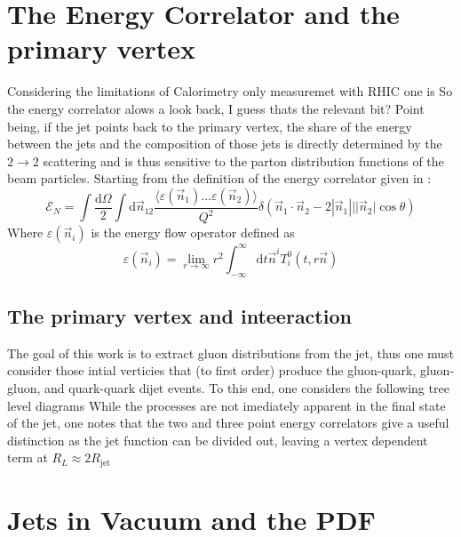 \documentclass[letterpaper, 12pt, oneside]{book}
\newcommand{\dd}{\textrm{d}}
\theoremstyle{definition}
\begin{document}
\chapter{The Energy Correlator and the primary vertex}
	\label{ch:ENC_th}
	Considering the limitations of Calorimetry only measuremet with RHIC one is 
So the energy correlator alows a look back, I guess thats the relevant bit? 
	Point being, if the jet points back to the primary vertex, the share of the energy between the jets and the composition of those jets is directly determined by the $2 \rightarrow 2$ scattering and is thus sensitive to the parton distribution functions of the beam particles. 
	Starting from the definition of the energy correlator given in \cite{Larkoski2013}:
	\begin{equation}
		\mathcal{E}_{N} = \int \frac{\dd \Omega}{2} \int \dd \vec{n}_{12} \frac{\langle \varepsilon \left( \vec{n}_1 \right) ... \varepsilon \left(\vec{n}_2 \right)\rangle}{Q^2} \delta\left( \vec{n}_1 \cdot \vec{n}_2 - 2|\vec{n}_1|||\vec{n}_2|\cos  \theta \right)
		\label{eq:ENC}
	\end{equation}
	Where $\varepsilon \left( \vec{n}_i \right)$ is the energy flow operator defined as 
	\begin{equation}
		\varepsilon \left( \vec{n}_i \right) = \lim_{r\rightarrow \infty} r^2 \int_{-\infty}^\infty \dd t \vec{n}^i T^0_{i}\left( t, r \vec{n} \right) 
		\label{eq:enrgy_flow_op}
	\end{equation}
	\section{The primary vertex and inteeraction}
	The goal of this work is to extract gluon distributions from the jet, thus one must consider those intial verticies that (to first order) produce the gluon-quark, gluon-gluon, and quark-quark dijet events. 
	To this end, one considers the following tree level diagrams 
	While the processes are not imediately apparent in the final state of the jet, one notes that the two and three point energy correlators give a useful distinction as the jet function can be divided out, leaving a vertex dependent term at $R_L \approx 2 R_{\textrm{jet}}$
\chapter{Jets in Vacuum and the PDF}
\end{document}
